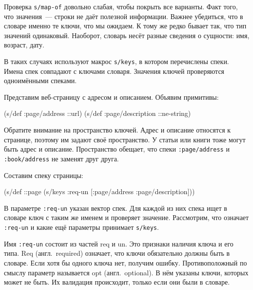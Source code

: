 \fi

Проверка \verb|s/map-of| довольно слабая, чтобы покрыть все варианты. Факт
того, что значения~--- строки не даёт полезной информации. Важнее убедиться, что
в словаре именно те ключи, что мы ожидаем. К тому же редко бывает так, что тип
значений одинаковый. Наоборот, словарь несёт разные сведения о сущности:
имя, возраст, дату.


В таких случаях используют макрос \verb|s/keys|, в котором перечислены
спеки. Имена спек совпадают с ключами словаря. Значения ключей проверяются
одноимёнными спеками.

Представим веб-страницу с адресом и описанием. Объявим примитивы:

\begin{english}
  \begin{clojure}
(s/def :page/address ::url)
(s/def :page/description ::ne-string)
  \end{clojure}
\end{english}


Обратите внимание на пространство ключей. Адрес и описание относятся к странице,
поэтому им задают своё пространство. У статьи или книги тоже могут быть адрес и
описание. Пространство обещает, что спеки \verb|:page/address| и
\verb|:book/address| не заменят друг друга.

Составим спеку страницы:

\begin{english}
  \begin{clojure}
(s/def ::page
  (s/keys :req-un [:page/address
                   :page/description]))
  \end{clojure}
\end{english}


В параметре \verb|:req-un| указан вектор спек. Для каждой из них спека ищет в
словаре ключ с таким же именем и проверяет значение. Рассмотрим, что означает
\verb|:req-un| и какие ещё параметры принимает \verb|s/keys|.

Имя \verb|:req-un| состоит из частей req и un. Это признаки наличия
ключа и его типа. Req (англ.~required) означает, что ключи обязательно должны
быть в словаре. Если хотя бы одного ключа нет, получим ошибку. Противоположный
по смыслу параметр называется opt (англ.~optional). В нём указаны ключи,
которых может не быть. Их валидация происходит, только если они были в словаре.

